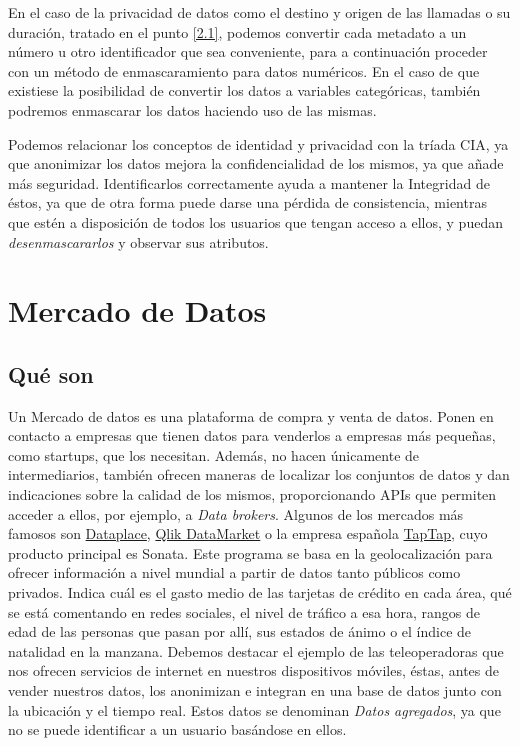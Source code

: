 \documentclass{article}
\begin{document}
En el caso de la privacidad de datos como el destino y origen de las llamadas o su duración, tratado en el punto \ref{2.1}, podemos convertir cada metadato a un número u otro identificador que sea conveniente, para a continuación proceder con un método de enmascaramiento para datos numéricos. En el caso de que existiese la posibilidad de convertir los datos a variables categóricas, también podremos enmascarar los datos haciendo uso de las mismas.

Podemos relacionar los conceptos de identidad y privacidad con la tríada CIA, ya que anonimizar los datos mejora la confidencialidad de los mismos, ya que añade más seguridad. Identificarlos correctamente ayuda a mantener la Integridad de éstos, ya que de otra forma puede darse una pérdida de consistencia, mientras que estén a disposición de todos los usuarios que tengan acceso a ellos, y puedan \textit{desenmascararlos} y observar sus atributos.

\section{Mercado de Datos}
\subsection{Qué son}
Un Mercado de datos es una plataforma de compra y venta de datos. Ponen en contacto a empresas que tienen datos para venderlos a empresas más pequeñas, como startups, que los necesitan. Además, no hacen únicamente de intermediarios, también ofrecen maneras de localizar los conjuntos de datos y dan indicaciones sobre la calidad de los mismos, proporcionando APIs que permiten acceder a ellos, por ejemplo, a \textit{Data brokers}. Algunos de los mercados más famosos son \href{https://www.datapace.io/}{Dataplace},  \href{https://www.qlik.com/us/products/qlik-data-market}{Qlik DataMarket} o la empresa española \href{https://www.taptapnetworks.com/}{TapTap}, cuyo producto principal es Sonata. Este programa se basa en la geolocalización para ofrecer información a nivel mundial a partir de datos tanto públicos como privados. Indica cuál es el gasto medio de las tarjetas de crédito en cada área, qué se está comentando en redes sociales, el nivel de tráfico a esa hora, rangos de edad de las personas que pasan por allí, sus estados de ánimo o  el índice de natalidad en la manzana. Debemos destacar el ejemplo de las teleoperadoras que nos ofrecen servicios de internet en nuestros dispositivos móviles, éstas, antes de vender nuestros datos, los anonimizan e integran en una base de datos junto con la ubicación y el tiempo real. Estos datos se denominan \textit{Datos agregados}, ya que no se puede identificar a un usuario basándose en ellos.
\end{document}
